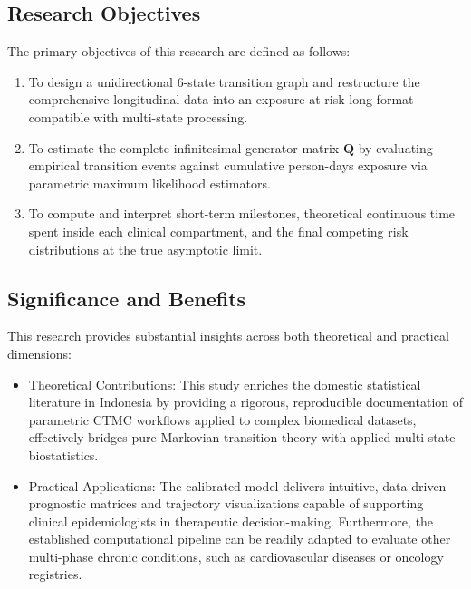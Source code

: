 \documentclass[9pt,a4paper,twocolumn,twoside]{rho-class/rho}
\begin{document}
    \subsection{Research Objectives}
    The primary objectives of this research are defined as follows:
    \begin{enumerate}
        \item To design a unidirectional 6-state transition graph and restructure the comprehensive longitudinal data into an exposure-at-risk long format compatible with multi-state processing.
            
        \item To estimate the complete infinitesimal generator matrix $\mathbf{Q}$ by evaluating empirical transition events against cumulative person-days exposure via parametric maximum likelihood estimators.
        
        \item To compute and interpret short-term milestones, theoretical continuous time spent inside each clinical compartment, and the final competing risk distributions at the true asymptotic limit.
    \end{enumerate}
        
    \subsection{Significance and Benefits}
    This research provides substantial insights across both theoretical and practical dimensions:
    \begin{itemize}
        \item Theoretical Contributions: This study enriches the domestic statistical literature in Indonesia by providing a rigorous, reproducible documentation of parametric CTMC workflows applied to complex biomedical datasets, effectively bridges pure Markovian transition theory with applied multi-state biostatistics.
        
        \item Practical Applications: The calibrated model delivers intuitive, data-driven prognostic matrices and trajectory visualizations capable of supporting clinical epidemiologists in therapeutic decision-making. Furthermore, the established computational pipeline can be readily adapted to evaluate other multi-phase chronic conditions, such as cardiovascular diseases or oncology registries.
    \end{itemize}
        
\end{document}
